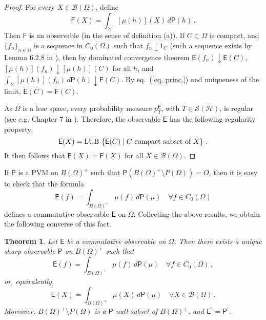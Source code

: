 \documentclass[12pt]{amsart}
\newtheorem{theorem}{Theorem}
\theoremstyle{definition}
\newcommand{\N}{\mathbb N} %
\newcommand{\sh}{\mathcal{S(H)}} %
\newcommand{\LUB}[1]{{\rm LUB}\, \left\{ #1 \right\}} %
\newcommand{\nil}{O} %
\newcommand{\Eo}{\mathsf{E}} %
\newcommand{\Fo}{\mathsf{F}} %
\newcommand{\PP}{\mathsf{P}} %
\newcommand{\bor}[1]{\mathcal{B}(#1)} %
\newcommand{\de}{\, d}
\begin{document}
\begin{proof}
For every $X\in\bor{\Omega}$, define
\begin{equation*}
\Fo (X) = \int_\Sigma [\mu(h)] (X) \de \PP (h) \, .
\end{equation*}
Then $\Fo$ is an observable (in the sense of definition {\rm (a)}). If $C\subset \Omega$ is compact, and $\{ f_n \}_{n\in\N}$ is a sequence in $C_0 (\Omega)$ such that $f_n \downarrow 1_C$ (such a sequence exists by Lemma 6.2.8 in \cite{AN89}), then by dominated convergence theorem $\Eo (f_n) \downarrow \Eo (C)$, $[\mu(h)] (f_n) \downarrow [\mu(h)] (C)$ for all $h$, and $\int_\Sigma [\mu(h)] (f_n) \de \PP (h) \downarrow \Fo (C)$. By eq.~(\ref{eq. princ.}) and uniqueness of the limit, $\Eo(C) = \Fo(C)$.

As $\Omega$ is a lcsc space, every probability measure $p^{\Eo}_T$, with $T\in\sh$, is regular (see e.g. Chapter 7 in \cite{RA99}). Therefore, the observable $\Eo$ has the following regularity property:
\begin{equation*}
\Eo(X) = \LUB{\Eo(C)\mid C \textrm{ compact subset of } X } \, .
\end{equation*}
It then follows that $\Eo(X) = \Fo(X)$ for all $X\in\bor{\Omega}$.
\end{proof}

If $\PP$ is a PVM on $B(\Omega)^+$ such that $\PP (B(\Omega)^+ \setminus P(\Omega)) = \nil$, then it is easy to check that the formula
\begin{equation*}
\Eo (f) = \int_{B(\Omega)^+} \mu(f) \de \PP(\mu) \quad \forall f\in C_0 (\Omega)
\end{equation*}
defines a commutative observable $\Eo$ on $\Omega$. Collecting the above results, we obtain the following converse of this fact.

\begin{theorem}\label{th:second}
Let $\Eo$ be a commutative observable on $\Omega$. Then there exists a unique sharp observable $\PP$ on $B(\Omega)^+$ such that
\begin{equation}\label{eq:rep-1}
\Eo (f) = \int_{B(\Omega)^+} \mu (f) \de \PP (\mu) \quad \forall f\in C_0 (\Omega) \, ,
\end{equation}
or, equivalently,
\begin{equation}\label{eq:rep-2}
\Eo (X) = \int_{B(\Omega)^+} \mu (X) \de \PP (\mu) \quad \forall X\in \bor{\Omega} \, .
\end{equation}
Moreover, $B(\Omega)^+ \setminus P(\Omega)$ is a $\PP$-null subset of $B(\Omega)^+$, and $\Eo^\prime = \PP^\prime$.
\end{theorem}
\end{document}
